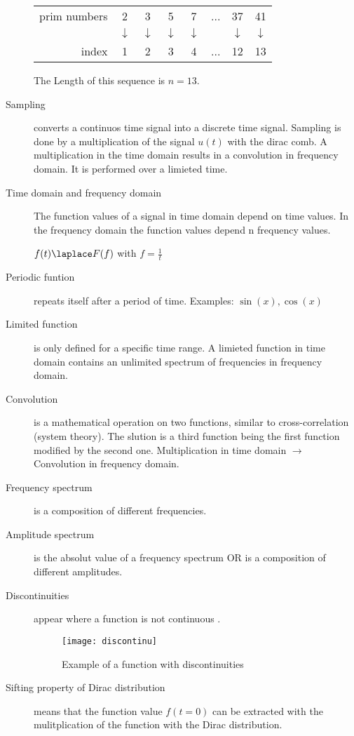 \begin{description}
	\begin{tabular}{rccccccc} 
		prim numbers &2 & 3 & 5 & 7 & ... & 37 & 41 \\  
		& $\downarrow$ & $\downarrow$ & $\downarrow$ & $\downarrow$ &  & $\downarrow$ &   $\downarrow$ \\ 
		index & 1 & 2 & 3 & 4 & ...   & 12 & 13 \\ 
	\end{tabular} 
	
	The Length of this sequence is $n=13$.
	
	\item[Sampling] converts a continuos time signal into a discrete time signal. Sampling is done by a multiplication of the signal $u(t)$ with the dirac comb. A multiplication in the time domain results in a convolution in frequency domain. It is performed over a limieted time.
	\item[Time domain and frequency domain] The function values of a signal in time domain depend on time values. In the frequency domain the function values depend n frequency values.
	
	$f(t) \laplace F(f)$ with $f=\frac{1}{t}$
	
	\item[Periodic funtion] repeats itself after a period of time. Examples: $\sin(x),\cos(x)$
	\item[Limited function] is only defined for a specific time range. A limieted function in time domain contains an unlimited spectrum of frequencies in frequency domain. 
	\item[Convolution] is a mathematical operation on two functions, similar to cross-correlation (system theory). The slution is a third function being the first function modified by the second one. Multiplication in time domain $\rightarrow$ Convolution in frequency domain.
	\item[Frequency spectrum] is a composition of different frequencies.
	\item[Amplitude spectrum] is the absolut value of a frequency spectrum OR is a composition of different amplitudes.
	\item[Discontinuities] appear where a function is not continuous .
		\begin{figure}
			\centering
			\texttt{[image: discontinu]}
			\caption{Example of a function with discontinuities}
			\label{fig:discontinu}
		\end{figure}
	

	\item[Sifting property of Dirac distribution] means that the function value $f(t=0)$ can be extracted with the mulitplication of the function with the Dirac distribution.
	

\end{description}
